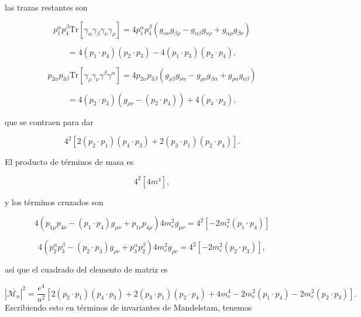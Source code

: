 las trazas restantes son

\begin{equation}
p_1^\alpha p_4^\beta \text{Tr}[\gamma_\alpha\gamma_\beta\gamma_\nu\gamma_\rho] = 4p_1^\alpha p_4^\beta (g_{\alpha\nu}g_{\beta\rho} - g_{\alpha\beta}g_{\nu\rho} + g_{\alpha\rho}g_{\beta\nu})
\end{equation}

\begin{equation}
= 4(p_1\cdot p_4)(p_2\cdot p_3) - 4(p_1\cdot p_3)(p_2\cdot p_4),
\end{equation}

\begin{equation}
p_{2\alpha}p_{3\beta} \text{Tr}[\gamma_\rho\gamma_\nu\gamma^\beta\gamma^\alpha] = 4p_{2\alpha}p_{3\beta}\left(g_{\rho\beta}g_{\nu\alpha} - g_{\rho\nu}g_{\beta\alpha} + g_{\rho\alpha}g_{\nu\beta}\right)
\end{equation}

\begin{equation}
= 4(p_2\cdot p_3)(g_{\rho\nu} - (p_2\cdot p_4)) + 4(p_4\cdot p_3),
\end{equation}

que se contraen para dar

\begin{equation}
4^2[2(p_2\cdot p_1)(p_4\cdot p_3) + 2(p_3\cdot p_1)(p_2\cdot p_4)].
\end{equation}

El producto de términos de masa es

\begin{equation}
4^2[4m^4],
\end{equation}

y los términos cruzados son

\begin{equation}
4(p_{1\mu}p_{4\nu} - (p_1\cdot p_4)g_{\mu\nu} + p_{1\nu}p_{4\mu})4m_e^2g_{\mu\nu} = 4^2[-2m_e^2(p_1\cdot p_4)]
\end{equation}

\begin{equation}
4(p_2^\alpha p_3^\beta - (p_2\cdot p_3)g_{\rho\nu} + p_3^\alpha p_2^\beta)4m_e^2g_{\rho\nu} = 4^2[-2m_e^2(p_2\cdot p_3)],
\end{equation}

así que el cuadrado del elemento de matriz es

\begin{equation}
|\overline{\mathcal{M}_u}|^2 = \frac{e^4}{u^2} \left[ 2(p_2 \cdot p_1)(p_4 \cdot p_3) + 2(p_3 \cdot p_1)(p_2 \cdot p_4) + 4m_e^4 - 2m_e^2(p_1 \cdot p_4) - 2m_e^2(p_2 \cdot p_3) \right].
\end{equation}
Escribiendo esto en términos de invariantes de Mandelstam, tenemos

